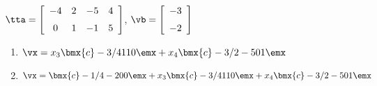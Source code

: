 {$\tta = \left[ \begin {array}{cccc} -4&2&-5&4\\\noalign{\medskip}0&1&-1&5
\end {array} \right] $, 
$\vb=\left[ \begin {array}{c} -3\\\noalign{\medskip}-2\end {array}\right] $}
{\begin{enumerate}
\item	 $\vx=x_3\bmx{c}-3/4\\1\\1\\0\emx+x_4\bmx{c}-3/2\\-5\\0\\1\emx$

\item	$\vx=\bmx{c}-1/4\\-2\\0\\0\emx + x_3\bmx{c}-3/4\\1\\1\\0\emx+x_4\bmx{c}-3/2\\-5\\0\\1\emx$
\end{enumerate}}

 